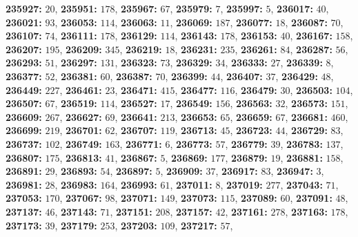 \textsf{\bfseries 235927:} $20$, \textsf{\bfseries 235951:} $178$, \textsf{\bfseries 235967:} $67$, \textsf{\bfseries 235979:} $7$, \textsf{\bfseries 235997:} $5$, \textsf{\bfseries 236017:} $40$, \textsf{\bfseries 236021:} $93$, \textsf{\bfseries 236053:} $114$, \textsf{\bfseries 236063:} $11$, \textsf{\bfseries 236069:} $187$, \textsf{\bfseries 236077:} $18$, \textsf{\bfseries 236087:} $70$, \textsf{\bfseries 236107:} $74$, \textsf{\bfseries 236111:} $178$, \textsf{\bfseries 236129:} $114$, \textsf{\bfseries 236143:} $178$, \textsf{\bfseries 236153:} $40$, \textsf{\bfseries 236167:} $158$, \textsf{\bfseries 236207:} $195$, \textsf{\bfseries 236209:} $345$, \textsf{\bfseries 236219:} $18$, \textsf{\bfseries 236231:} $235$, \textsf{\bfseries 236261:} $84$, \textsf{\bfseries 236287:} $56$, \textsf{\bfseries 236293:} $51$, \textsf{\bfseries 236297:} $131$, \textsf{\bfseries 236323:} $73$, \textsf{\bfseries 236329:} $34$, \textsf{\bfseries 236333:} $27$, \textsf{\bfseries 236339:} $8$, \textsf{\bfseries 236377:} $52$, \textsf{\bfseries 236381:} $60$, \textsf{\bfseries 236387:} $70$, \textsf{\bfseries 236399:} $44$, \textsf{\bfseries 236407:} $37$, \textsf{\bfseries 236429:} $48$, \textsf{\bfseries 236449:} $227$, \textsf{\bfseries 236461:} $23$, \textsf{\bfseries 236471:} $415$, \textsf{\bfseries 236477:} $116$, \textsf{\bfseries 236479:} $30$, \textsf{\bfseries 236503:} $104$, \textsf{\bfseries 236507:} $67$, \textsf{\bfseries 236519:} $114$, \textsf{\bfseries 236527:} $17$, \textsf{\bfseries 236549:} $156$, \textsf{\bfseries 236563:} $32$, \textsf{\bfseries 236573:} $151$, \textsf{\bfseries 236609:} $267$, \textsf{\bfseries 236627:} $69$, \textsf{\bfseries 236641:} $213$, \textsf{\bfseries 236653:} $65$, \textsf{\bfseries 236659:} $67$, \textsf{\bfseries 236681:} $460$, \textsf{\bfseries 236699:} $219$, \textsf{\bfseries 236701:} $62$, \textsf{\bfseries 236707:} $119$, \textsf{\bfseries 236713:} $45$, \textsf{\bfseries 236723:} $44$, \textsf{\bfseries 236729:} $83$, \textsf{\bfseries 236737:} $102$, \textsf{\bfseries 236749:} $163$, \textsf{\bfseries 236771:} $6$, \textsf{\bfseries 236773:} $57$, \textsf{\bfseries 236779:} $39$, \textsf{\bfseries 236783:} $137$, \textsf{\bfseries 236807:} $175$, \textsf{\bfseries 236813:} $41$, \textsf{\bfseries 236867:} $5$, \textsf{\bfseries 236869:} $177$, \textsf{\bfseries 236879:} $19$, \textsf{\bfseries 236881:} $158$, \textsf{\bfseries 236891:} $29$, \textsf{\bfseries 236893:} $54$, \textsf{\bfseries 236897:} $5$, \textsf{\bfseries 236909:} $37$, \textsf{\bfseries 236917:} $83$, \textsf{\bfseries 236947:} $3$, \textsf{\bfseries 236981:} $28$, \textsf{\bfseries 236983:} $164$, \textsf{\bfseries 236993:} $61$, \textsf{\bfseries 237011:} $8$, \textsf{\bfseries 237019:} $277$, \textsf{\bfseries 237043:} $71$, \textsf{\bfseries 237053:} $170$, \textsf{\bfseries 237067:} $98$, \textsf{\bfseries 237071:} $149$, \textsf{\bfseries 237073:} $115$, \textsf{\bfseries 237089:} $60$, \textsf{\bfseries 237091:} $48$, \textsf{\bfseries 237137:} $46$, \textsf{\bfseries 237143:} $71$, \textsf{\bfseries 237151:} $208$, \textsf{\bfseries 237157:} $42$, \textsf{\bfseries 237161:} $278$, \textsf{\bfseries 237163:} $178$, \textsf{\bfseries 237173:} $39$, \textsf{\bfseries 237179:} $253$, \textsf{\bfseries 237203:} $109$, \textsf{\bfseries 237217:} $57$, 
